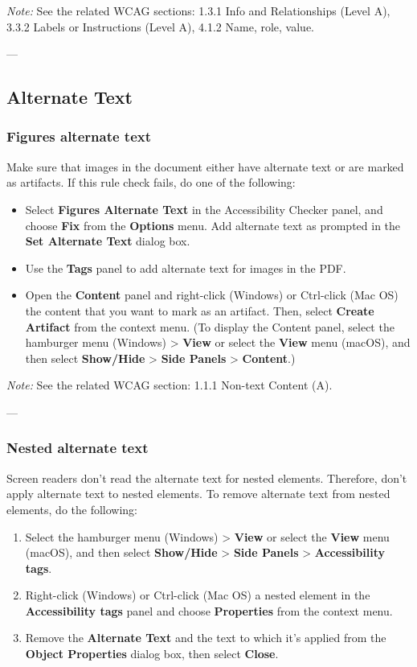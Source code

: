 \vspace{0.5em}
\noindent\textit{Note:} See the related WCAG sections: 1.3.1 Info and Relationships (Level A), 3.3.2 Labels or Instructions (Level A), 4.1.2 Name, role, value\footnotemark[1].

---

\subsection*{Alternate Text}
\subsubsection*{Figures alternate text}
Make sure that images in the document either have alternate text or are marked as artifacts\footnotemark[1].
If this rule check fails, do one of the following:
\begin{itemize}
    \item Select \textbf{Figures Alternate Text} in the Accessibility Checker panel, and choose \textbf{Fix} from the \textbf{Options} menu. Add alternate text as prompted in the \textbf{Set Alternate Text} dialog box.
    \item Use the \textbf{Tags} panel to add alternate text for images in the PDF.
    \item Open the \textbf{Content} panel and right-click (Windows) or Ctrl-click (Mac OS) the content that you want to mark as an artifact. Then, select \textbf{Create Artifact} from the context menu. (To display the Content panel, select the hamburger menu (Windows) > \textbf{View} or select the \textbf{View} menu (macOS), and then select \textbf{Show/Hide} > \textbf{Side Panels} > \textbf{Content}.)
\end{itemize}

\vspace{0.5em}
\noindent\textit{Note:} See the related WCAG section: 1.1.1 Non-text Content (A)\footnotemark[1].

---

\subsubsection*{Nested alternate text}
Screen readers don't read the alternate text for nested elements. Therefore, don't apply alternate text to nested elements\footnotemark[1].
To remove alternate text from nested elements, do the following:
\begin{enumerate}
    \item Select the hamburger menu (Windows) > \textbf{View} or select the \textbf{View} menu (macOS), and then select \textbf{Show/Hide} > \textbf{Side Panels} > \textbf{Accessibility tags}.
    \item Right-click (Windows) or Ctrl-click (Mac OS) a nested element in the \textbf{Accessibility tags} panel and choose \textbf{Properties} from the context menu.
    \item Remove the \textbf{Alternate Text} and the text to which it's applied from the \textbf{Object Properties} dialog box, then select \textbf{Close}.
\end{enumerate}

